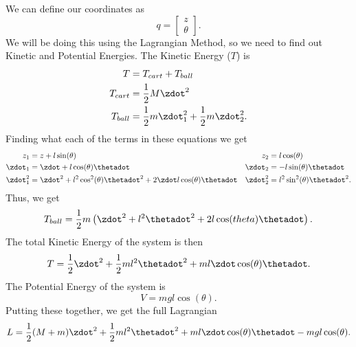 \documentclass[10pt]{article}
\begin{document}
We can define our coordinates as 
\begin{equation}
  q =
  \begin{bmatrix}
    z\\ \theta
  \end{bmatrix}.
\end{equation}
We will be doing this using the Lagrangian Method, so we need to find
out Kinetic and Potential Energies.
The Kinetic Energy ($T$) is
\begin{equation}
  \begin{split}
  T & = T_{cart} + T_{ball}\\
  T_{cart} & = \frac{1}{2} M\zdot^2\\
  T_{ball} & = \frac{1}{2} m\zdot_1^2 + \frac{1}{2} m\zdot_2^2.
  \end{split}
\end{equation}
Finding what each of the terms in these equations we get
\begin{align}
  z_1 &= z + l\sin(\theta) & z_2 &= l\cos(\theta)\\
  \zdot_1 &= \zdot + l\cos(\theta)\thetadot & \zdot_2 &=
  -l\sin(\theta)\thetadot \\
  \zdot_1^2 &= \zdot^2 + l^2 \cos^2(\theta)\thetadot^2 + 2\zdot l
  \cos(\theta)\thetadot & \zdot_2^2 &= l^2\sin^2(\theta)\thetadot^2.
\end{align}
Thus, we get 
\begin{equation}
  T_{ball} = \frac{1}{2}m\left(\zdot^2 + l^2\thetadot^2 +
    2l\cos(theta)\thetadot \right).
\end{equation}
The total Kinetic Energy of the system is then
\begin{equation}
  T = \frac{1}{2}\zdot^2 + \frac{1}{2}ml^2\thetadot^2 +
  ml\zdot\cos(\theta)\thetadot.
\end{equation}
The Potential Energy of the system is 
\begin{equation}
  V = mgl\cos(\theta).
\end{equation}
Putting these together, we get the full Lagrangian
\begin{equation}
  L = \frac{1}{2} (M + m)\zdot^2 + \frac{1}{2}ml^2\thetadot^2 +
  ml\zdot\cos(\theta)\thetadot - mgl\cos(\theta).
\end{equation}
\end{document}
